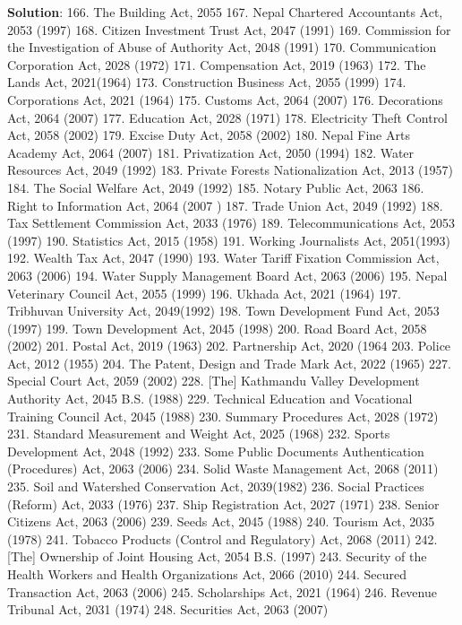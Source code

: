 \documentclass[
]{book}
\newenvironment{solution}{ {\bfseries Solution}:}{}
\begin{document}
\begin{questions}
\begin{solution}
166. The Building Act, 2055
167. Nepal Chartered Accountants Act, 2053 (1997)
168. Citizen Investment Trust Act, 2047 (1991)
169. Commission for the Investigation of Abuse of Authority Act, 2048 (1991)
170. Communication Corporation Act, 2028 (1972)
171. Compensation Act, 2019 (1963)
172. The Lands Act, 2021(1964)
173. Construction Business Act, 2055 (1999)
174. Corporations Act, 2021 (1964)
175. Customs Act, 2064 (2007)
176. Decorations Act, 2064 (2007)
177. Education Act, 2028 (1971)
178. Electricity Theft Control Act, 2058 (2002)
179. Excise Duty Act, 2058 (2002)
180. Nepal Fine Arts Academy Act, 2064 (2007)
181. Privatization Act, 2050 (1994)
182. Water Resources Act, 2049 (1992)
183. Private Forests Nationalization Act, 2013 (1957)
184. The Social Welfare Act, 2049 (1992)
185. Notary Public Act, 2063
186. Right to Information Act, 2064 (2007 )
187. Trade Union Act, 2049 (1992)
188. Tax Settlement Commission Act, 2033 (1976)
189. Telecommunications Act, 2053 (1997)
190. Statistics Act, 2015 (1958)
191. Working Journalists Act, 2051(1993)
192. Wealth Tax Act, 2047 (1990)
193. Water Tariff Fixation Commission Act, 2063 (2006)
194. Water Supply Management Board Act, 2063 (2006)
195. Nepal Veterinary Council Act, 2055 (1999)
196. Ukhada Act, 2021 (1964)
197. Tribhuvan University Act, 2049(1992)
198. Town Development Fund Act, 2053 (1997)
199. Town Development Act, 2045 (1998)
200. Road Board Act, 2058 (2002)
201. Postal Act, 2019 (1963)
202. Partnership Act, 2020 (1964
203. Police Act, 2012 (1955)
204. The Patent, Design and Trade Mark Act, 2022 (1965)
227. Special Court Act, 2059 (2002)
228. [The] Kathmandu Valley Development Authority Act, 2045 B.S. (1988)
229. Technical Education and Vocational Training Council Act, 2045 (1988)
230. Summary Procedures Act, 2028 (1972)
231. Standard Measurement and Weight Act, 2025 (1968)
232. Sports Development Act, 2048 (1992)
233. Some Public Documents Authentication (Procedures) Act, 2063 (2006)
234. Solid Waste Management Act, 2068 (2011)
235. Soil and Watershed Conservation Act, 2039(1982)
236. Social Practices (Reform) Act, 2033 (1976)
237. Ship Registration Act, 2027 (1971)
238. Senior Citizens Act, 2063 (2006)
239. Seeds Act, 2045 (1988)
240. Tourism Act, 2035 (1978)
241. Tobacco Products (Control and Regulatory) Act, 2068 (2011)
242. [The] Ownership of Joint Housing Act, 2054 B.S. (1997)
243. Security of the Health Workers and Health Organizations Act, 2066 (2010)
244. Secured Transaction Act, 2063 (2006)
245. Scholarships Act, 2021 (1964)
246. Revenue Tribunal Act, 2031 (1974)
248. Securities Act, 2063 (2007)

\end{solution}
\end{questions}
\end{document}
